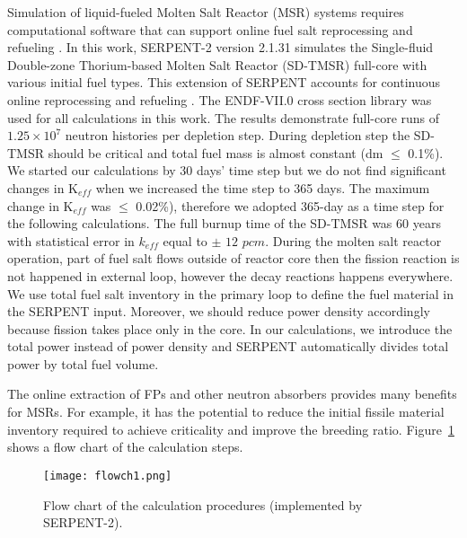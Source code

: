 Simulation of liquid-fueled Molten Salt Reactor (MSR) systems requires 
computational software that can support online fuel salt reprocessing and 
refueling \cite{serp2014molten}. In this work, SERPENT-2 version 2.1.31 \cite{leppanen2014serpent} simulates the 
Single-fluid Double-zone Thorium-based Molten Salt Reactor (SD-TMSR) full-core with various initial fuel types. This extension 
of SERPENT accounts for continuous online reprocessing and refueling 
\cite{aufiero2013extended}. The ENDF-VII.0 cross section library was used for all 
calculations in this work. The results demonstrate full-core runs of 
$1.25\times 10^7$ neutron histories per depletion step. During depletion step the SD-TMSR should be critical and total fuel mass is almost constant (dm $\leq$ 0.1\%). We started our calculations by 30 days' time step but we do not find significant changes in K$_{eff}$ when we increased the time step to 365 days. The maximum change in K$_{eff}$ was $\leq$ 0.02\%), therefore we adopted 365-day as a time step for the following calculations.
The full burnup time of 
the SD-TMSR was 60 years with statistical error in $k_{eff}$ equal to $\pm$ 
$12$ $pcm$. 
During the molten salt reactor operation, part of fuel salt flows outside of reactor core then the fission reaction is not happened in external loop, however the decay reactions happens everywhere. We use total fuel salt inventory in the primary loop to define the fuel material in the SERPENT input. Moreover, we should reduce power density accordingly because fission takes place only in the core. In our calculations, we introduce the total power instead of power density and SERPENT automatically divides total power by total fuel volume.

The online extraction of \gls{FPs} and other neutron absorbers 
provides many benefits for MSRs. For example, it has the potential to reduce the initial 
fissile material inventory required to achieve criticality and improve the 
breeding ratio. Figure~\ref{fig:flow} shows a flow chart of the calculation 
steps. 

\begin{figure}[t!] %
	\texttt{[image: flowch1.png]}
	\caption{Flow chart of the calculation procedures (implemented by SERPENT-2).}
	\label{fig:flow}
\end{figure}

